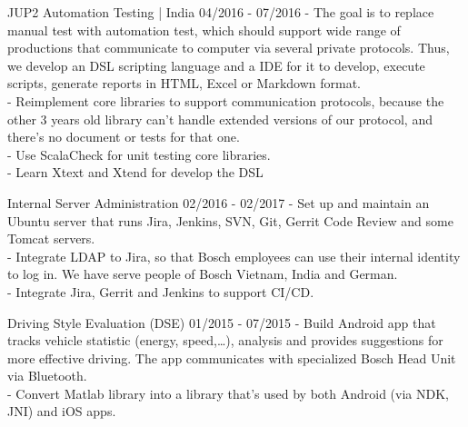 {  \event
  {JUP2 Automation Testing | India}
  {04/2016 - 07/2016}
  {
    - The goal is to replace manual test with automation test, which should
    support wide range of productions that communicate to computer via several
    private protocols. Thus, we develop an DSL scripting language and a IDE for
    it to develop, execute scripts, generate reports in HTML, Excel or Markdown
    format.
    \\
    - Reimplement core libraries to support communication protocols, because
    the other 3 years old library can't  handle extended versions of
    our protocol, and there's no document or tests for that one.
    \\
    - Use ScalaCheck for unit testing core libraries.\\
    - Learn Xtext and Xtend for develop the DSL
  }

  \event
  {Internal Server Administration}
  {02/2016 - 02/2017}
  {
    - Set up and maintain an Ubuntu server that runs Jira, Jenkins,
    SVN, Git, Gerrit Code Review and some Tomcat servers.\\
    - Integrate LDAP to Jira, so that Bosch employees can use their internal
    identity to log in. We have serve people of Bosch Vietnam, India and
    German. \\
    - Integrate Jira, Gerrit and Jenkins to support CI/CD.
  }

  \event
  {Driving Style Evaluation (DSE)}
  {01/2015 - 07/2015}
  {
    - Build Android app that tracks vehicle statistic (energy, speed,\dots),
    analysis and provides suggestions for more effective driving. The app
    communicates with specialized Bosch Head Unit via Bluetooth.
    \\
    - Convert Matlab library into a \cpp{} library that's used by
     both Android (via NDK, JNI) and iOS apps.
  }
}
